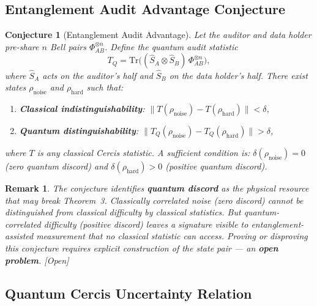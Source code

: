 \documentclass[12pt,a4paper]{article}
\newtheorem{remark}[theorem]{Remark}
\newtheorem{conjecture}[theorem]{Conjecture}
\newcommand{\openquest}{\textcolor{red!70!black}{\small\textsf{[Open]}}}
\newcommand{\Tr}{\mathrm{Tr}}
\begin{document}
\subsection{Entanglement Audit Advantage Conjecture}

\begin{conjecture}[Entanglement Audit Advantage]
\label{conj:entanglement}
Let the auditor and data holder pre-share $n$ Bell pairs $\Phi_{AB}^{\otimes n}$.
Define the quantum audit statistic
\begin{equation}\label{eq:TQ}
    T_Q = \Tr\big((\hat{S}_A\otimes\hat{S}_B)\,\Phi_{AB}^{\otimes n}\big),
\end{equation}
where $\hat{S}_A$ acts on the auditor's half and $\hat{S}_B$ on the data
holder's half.  There exist states $\rho_{\mathrm{noise}}$ and
$\rho_{\mathrm{hard}}$ such that:
\begin{enumerate}[label=(\roman*)]
    \item \textbf{Classical indistinguishability}:
          $\|T(\rho_{\mathrm{noise}})-T(\rho_{\mathrm{hard}})\|<\delta$,
    \item \textbf{Quantum distinguishability}:
          $\|T_Q(\rho_{\mathrm{noise}})-T_Q(\rho_{\mathrm{hard}})\|>\delta$,
\end{enumerate}
where $T$ is any classical Cercis statistic.  A sufficient condition is:
$\delta(\rho_{\mathrm{noise}})=0$ (zero quantum discord) and
$\delta(\rho_{\mathrm{hard}})>0$ (positive quantum discord).
\end{conjecture}

\begin{remark}
The conjecture identifies \textbf{quantum discord} as the physical resource
that may break Theorem~3.  Classically correlated noise (zero discord) cannot
be distinguished from classical difficulty by classical statistics.  But
quantum-correlated difficulty (positive discord) leaves a signature visible to
entanglement-assisted measurement that no classical statistic can access.
Proving or disproving this conjecture requires explicit construction of the
state pair — an \textbf{open problem}.  \openquest
\end{remark}

\subsection{Quantum Cercis Uncertainty Relation}
\end{document}
